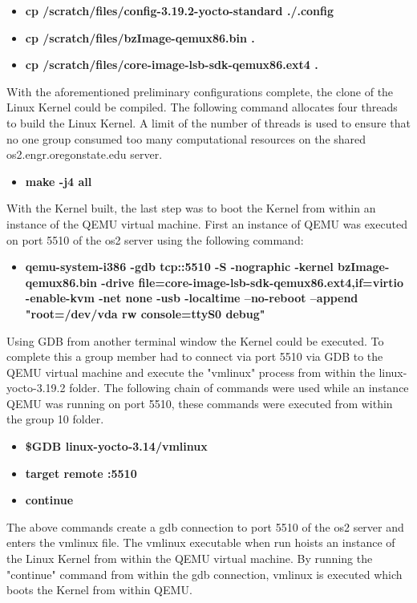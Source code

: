 \documentclass[10pt,onecolumn,draftclsnofoot]{IEEEtran} %
\begin{document}
\begin{singlespace}
\hfill\break
  \begin{itemize}
    \item \textbf{cp /scratch/files/config-3.19.2-yocto-standard ./.config}
    \item \textbf{cp /scratch/files/bzImage-qemux86.bin .}
    \item \textbf{cp /scratch/files/core-image-lsb-sdk-qemux86.ext4 .}
  \end{itemize}
\hfill\break
  \normalfont \indent With the aforementioned preliminary configurations complete, the clone of the Linux Kernel could be compiled. The following command allocates four threads to build the Linux Kernel. A limit of the number of threads is used to ensure that no one group consumed too many computational resources on the shared os2.engr.oregonstate.edu server.
\hfill\break
  \begin{itemize}
    \item \textbf{make -j4 all}
  \end{itemize}
\hfill\break
  \normalfont \indent With the Kernel built, the last step was to boot the Kernel from within an instance of the QEMU virtual machine. First an instance of QEMU was executed on port 5510 of the os2 server using the following command:
\hfill\break
  \begin{itemize}
    \item \textbf{qemu-system-i386 -gdb tcp::5510 -S -nographic -kernel bzImage-qemux86.bin -drive file=core-image-lsb-sdk-qemux86.ext4,if=virtio -enable-kvm -net none -usb -localtime --no-reboot --append "root=/dev/vda rw console=ttyS0 debug"}
  \end{itemize}
\hfill\break
  \normalfont \indent Using GDB from another terminal window the Kernel could be executed. To complete this a group member had to connect via port 5510 via GDB to the QEMU virtual machine and execute the "vmlinux" process from within the linux-yocto-3.19.2 folder. The following chain of commands were used while an instance QEMU was running on port 5510, these commands were executed from within the group 10 folder.

  \hfill\break
  \begin{itemize}
    \item \textbf{\$GDB linux-yocto-3.14/vmlinux}
    \item \textbf{target remote :5510}
    \item \textbf{continue}
  \end{itemize}
\hfill\break

  \normalfont \indent The above commands create a gdb connection to port 5510 of the os2 server and enters the vmlinux file. The vmlinux executable when run hoists an instance of the Linux Kernel from within the QEMU virtual machine. By running the "continue" command from within the gdb connection, vmlinux is executed which boots the Kernel from within QEMU.



\end{singlespace}
\end{document}
